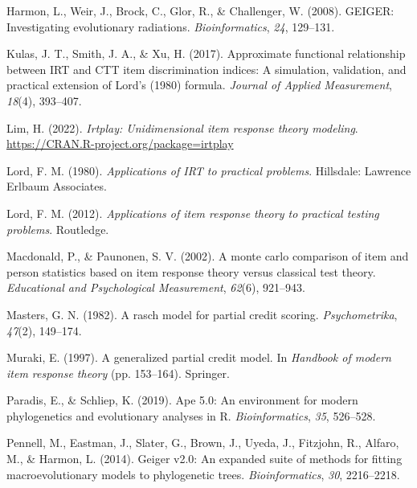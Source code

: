 \documentclass[
  man]{apa6}
\newlength{\cslhangindent}
\newlength{\cslentryspacingunit} %
\newenvironment{CSLReferences}[2] %
 {%
  \setlength{\parindent}{0pt}
  \ifodd #1
  \let\oldpar\par
  \def\par{\hangindent=\cslhangindent\oldpar}
  \fi
  \setlength{\parskip}{#2\cslentryspacingunit}
 }%
 {}
\begin{document}
\begin{CSLReferences}{1}{0}
\leavevmode{}%
Harmon, L., Weir, J., Brock, C., Glor, R., \& Challenger, W. (2008). GEIGER: Investigating evolutionary radiations. \emph{Bioinformatics}, \emph{24}, 129--131.

\leavevmode{}%
Kulas, J. T., Smith, J. A., \& Xu, H. (2017). Approximate functional relationship between IRT and CTT item discrimination indices: A simulation, validation, and practical extension of {Lord's} (1980) formula. \emph{Journal of Applied Measurement}, \emph{18}(4), 393--407.

\leavevmode{}%
Lim, H. (2022). \emph{Irtplay: Unidimensional item response theory modeling}. \url{https://CRAN.R-project.org/package=irtplay}

\leavevmode{}%
Lord, F. M. (1980). \emph{Applications of IRT to practical problems}. Hillsdale: Lawrence Erlbaum Associates.

\leavevmode{}%
Lord, F. M. (2012). \emph{Applications of item response theory to practical testing problems}. Routledge.

\leavevmode{}%
Macdonald, P., \& Paunonen, S. V. (2002). A monte carlo comparison of item and person statistics based on item response theory versus classical test theory. \emph{Educational and Psychological Measurement}, \emph{62}(6), 921--943.

\leavevmode{}%
Masters, G. N. (1982). A rasch model for partial credit scoring. \emph{Psychometrika}, \emph{47}(2), 149--174.

\leavevmode{}%
Muraki, E. (1997). A generalized partial credit model. In \emph{Handbook of modern item response theory} (pp. 153--164). Springer.

\leavevmode{}%
Paradis, E., \& Schliep, K. (2019). Ape 5.0: An environment for modern phylogenetics and evolutionary analyses in {R}. \emph{Bioinformatics}, \emph{35}, 526--528.

\leavevmode{}%
Pennell, M., Eastman, J., Slater, G., Brown, J., Uyeda, J., Fitzjohn, R., Alfaro, M., \& Harmon, L. (2014). Geiger v2.0: An expanded suite of methods for fitting macroevolutionary models to phylogenetic trees. \emph{Bioinformatics}, \emph{30}, 2216--2218.


\end{CSLReferences}
\end{document}
